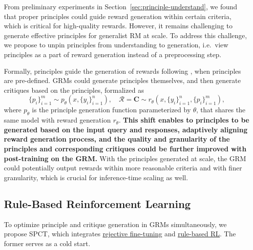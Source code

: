 \documentclass{article} %
\begin{document}
From preliminary experiments in Section~\ref{sec:principle-understand}, we found that proper principles could guide reward generation within certain criteria, which is critical for high-quality rewards. However, it remains challenging to generate effective principles for generalist RM at scale. To address this challenge, we propose to unpin principles from understanding to generation, i.e.~view principles as a part of reward generation instead of a preprocessing step. 

Formally, principles guide the generation of rewards following , when principles are pre-defined. GRMs could generate principles themselves, and then generate critiques based on the principles, formalized as 
\begin{equation}
\{p_i\}_{i=1}^m \sim p_{\theta}\left(x, \{y_i\}_{i=1}^n\right), \quad \mathcal{R} = \boldsymbol{C} \sim r_{\theta}\left(x, \{y_i\}_{i=1}^n, \{p_i\}_{i=1}^m\right),
\end{equation}
where $p_{\theta}$ is the principle generation function parameterized by $\theta$, that shares the same model with reward generation $r_{\theta}$. \textbf{This shift enables to principles to be generated based on the input query and responses, adaptively aligning reward generation process, and the quality and granularity of the principles and corresponding critiques could be further improved with post-training on the GRM.} With the principles generated at scale, the GRM could potentially output rewards within more reasonable criteria and with finer granularity, which is crucial for inference-time scaling as well.


\vspace{-0.5em}
\subsection{Rule-Based Reinforcement Learning}

To optimize principle and critique generation in GRMs simultaneously, we propose SPCT, which integrates \uline{rejective fine-tuning} and \uline{rule-based RL}. The former serves as a cold start. 
\end{document}
